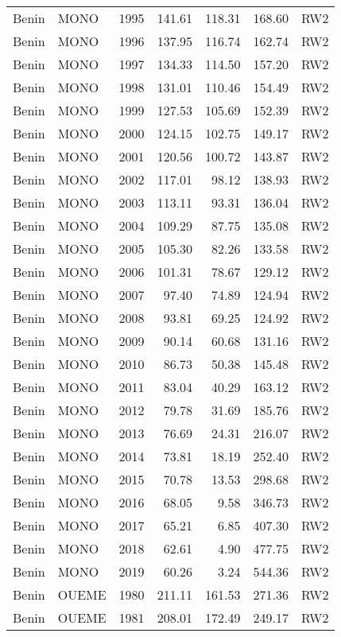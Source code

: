 \begin{longtable}{lllrrrl}
  Benin & MONO & 1995 & 141.61 & 118.31 & 168.60 & RW2 \\ 
  Benin & MONO & 1996 & 137.95 & 116.74 & 162.74 & RW2 \\ 
  Benin & MONO & 1997 & 134.33 & 114.50 & 157.20 & RW2 \\ 
  Benin & MONO & 1998 & 131.01 & 110.46 & 154.49 & RW2 \\ 
  Benin & MONO & 1999 & 127.53 & 105.69 & 152.39 & RW2 \\ 
  Benin & MONO & 2000 & 124.15 & 102.75 & 149.17 & RW2 \\ 
  Benin & MONO & 2001 & 120.56 & 100.72 & 143.87 & RW2 \\ 
  Benin & MONO & 2002 & 117.01 & 98.12 & 138.93 & RW2 \\ 
  Benin & MONO & 2003 & 113.11 & 93.31 & 136.04 & RW2 \\ 
  Benin & MONO & 2004 & 109.29 & 87.75 & 135.08 & RW2 \\ 
  Benin & MONO & 2005 & 105.30 & 82.26 & 133.58 & RW2 \\ 
  Benin & MONO & 2006 & 101.31 & 78.67 & 129.12 & RW2 \\ 
  Benin & MONO & 2007 & 97.40 & 74.89 & 124.94 & RW2 \\ 
  Benin & MONO & 2008 & 93.81 & 69.25 & 124.92 & RW2 \\ 
  Benin & MONO & 2009 & 90.14 & 60.68 & 131.16 & RW2 \\ 
  Benin & MONO & 2010 & 86.73 & 50.38 & 145.48 & RW2 \\ 
  Benin & MONO & 2011 & 83.04 & 40.29 & 163.12 & RW2 \\ 
  Benin & MONO & 2012 & 79.78 & 31.69 & 185.76 & RW2 \\ 
  Benin & MONO & 2013 & 76.69 & 24.31 & 216.07 & RW2 \\ 
  Benin & MONO & 2014 & 73.81 & 18.19 & 252.40 & RW2 \\ 
  Benin & MONO & 2015 & 70.78 & 13.53 & 298.68 & RW2 \\ 
  Benin & MONO & 2016 & 68.05 & 9.58 & 346.73 & RW2 \\ 
  Benin & MONO & 2017 & 65.21 & 6.85 & 407.30 & RW2 \\ 
  Benin & MONO & 2018 & 62.61 & 4.90 & 477.75 & RW2 \\ 
  Benin & MONO & 2019 & 60.26 & 3.24 & 544.36 & RW2 \\ 
  Benin & OUEME & 1980 & 211.11 & 161.53 & 271.36 & RW2 \\ 
  Benin & OUEME & 1981 & 208.01 & 172.49 & 249.17 & RW2 \\ 

\end{longtable}
